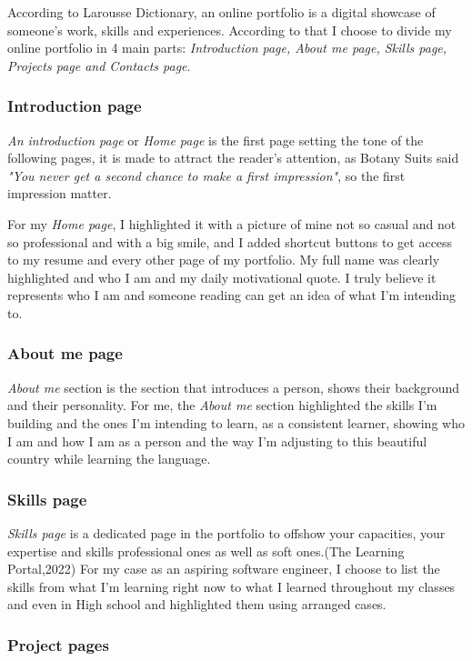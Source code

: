 \documentclass[12pt]{article}
\begin{document}
 
 According to Larousse Dictionary, an online portfolio is a digital showcase of someone's work, skills and experiences.
 According to that I choose to divide my online portfolio in 4 main parts:
 \textit{Introduction page, About me page, Skills page, Projects page and Contacts page}. 

 \subsubsection{Introduction page}

 \textit{An introduction page} or \textit{Home page} is the first page setting the tone of the following pages, it is made to attract the reader's attention, as Botany Suits said \textit{"You never get a second chance to make a first impression"}, so the first impression matter.


For my \textit{Home page}, I highlighted it with a picture of mine not so casual and not so professional and with a big smile, and I added shortcut buttons to get access to my resume and every other page of my portfolio. My full name was clearly highlighted and who I am and my daily motivational quote.
I truly believe it represents who I am and someone reading can get an idea of what I'm intending to.


\subsubsection{About me page} 
\textit{About me} section is the section that introduces a person, shows their background and their personality. For me, the \textit{About me} section highlighted the skills I'm building and the ones I'm intending to learn, as a consistent learner, showing who I am and how I am as a person and the way I'm adjusting to this beautiful country while learning the language. 

\subsubsection{Skills page}
\textit{Skills page} is a dedicated page in the portfolio to offshow your capacities, your expertise and skills professional ones as well as soft ones.(The Learning Portal,2022)
For my case as an aspiring software engineer, I choose to list the skills from what I'm learning right now to what I learned throughout my classes and even in High school and highlighted them using arranged cases.

\subsubsection{Project pages}
\end{document}

